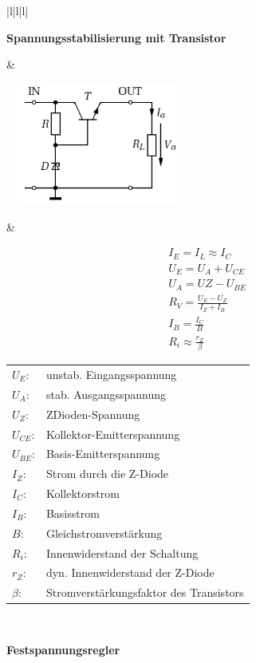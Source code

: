 \begin{longtable}{|l|l|l|}
\hline
\begin{minipage}{4cm}
\textbf{Spannungsstabilisierung mit Transistor}\\
\end{minipage}
&
\begin{minipage}{6cm}
\includegraphics[width=6cm, height =
4cm]{pictures/transistorStabilisierung}
\end{minipage}
&
\begin{minipage}{8cm}
\begin{gather}
I_{E}=I_{L}\approx I_{C}\\
U_{E}=U_{A}+U_{CE}\\
U_{A}=U{Z}-U_{BE}\\
R_{V}=\frac{U_{E}-U_{Z}}{I_{Z}+I_{B}}\\
I_{B}=\frac{I_{C}}{B}\\
R_{i}\approx\frac{r_{Z}}{\beta} 
\end{gather}
\begin{tabular}{ll}
$U_{E}$:&unstab. Eingangsspannung\\
$U_{A}$:&stab. Ausgangsspannung\\
$U_{Z}$:&ZDioden-Spannung\\
$U_{CE}$:&Kollektor-Emitterspannung\\
$U_{BE}$:&Basis-Emitterspannung\\
$I_{Z}$:&Strom durch die Z-Diode\\
$I_{C}$:&Kollektorstrom\\
$I_{B}$:&Basisstrom\\
$B$:&Gleichstromverstärkung\\
$R_{i}$:&Innenwiderstand der Schaltung\\
$r_{Z}$:&dyn. Innenwiderstand der Z-Diode\\
$\beta$:&Stromverstärkungsfaktor des Transistors
\end{tabular}
\end{minipage}
\\
\hline
\begin{minipage}{4cm}
\textbf{Festspannungsregler}\\

\end{minipage}
\end{longtable}
